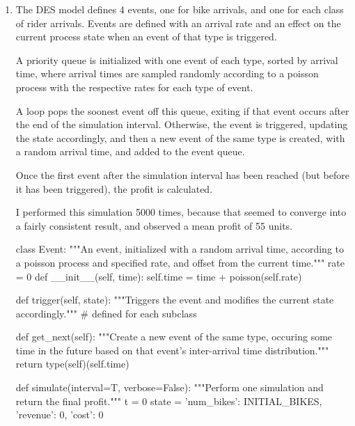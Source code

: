 \begin{solution}

    \begin{enumerate}
        \item The DES model defines 4 events, one for bike arrivals, and
            one for each class of rider arrivals. Events are defined
            with an arrival rate and an effect on the current process
            state when an event of that type is triggered.

            A priority queue is initialized with one event of each type,
            sorted by arrival time, where arrival times are sampled
            randomly according to a poisson process with the respective
            rates for each type of event.

            A loop pops the soonest event off this queue, exiting if
            that event occurs after the end of the simulation interval.
            Otherwise, the event is triggered, updating the state
            accordingly, and then a new event of the same type is
            created, with a random arrival time, and added to the event
            queue.

            Once the first event after the simulation interval has been
            reached (but before it has been triggered), the profit is
            calculated.

            I performed this simulation 5000 times, because that seemed
            to converge into a fairly consistent result, and observed a
            mean profit of 55 units.

            \begin{python}
class Event:
    """An event, initialized with a random arrival time,
    according to a poisson process and specified rate,
    and offset from the current time."""
    rate = 0
    def __init__(self, time):
        self.time = time + poisson(self.rate)

    def trigger(self, state):
        """Triggers the event and modifies the current state
        accordingly."""
        # defined for each subclass

    def get_next(self):
        """Create a new event of the same type,
        occuring some time in the future based on
        that event's inter-arrival time distribution."""
        return type(self)(self.time)
            \end{python}

            \begin{python}
def simulate(interval=T, verbose=False):
    """Perform one simulation and return the final profit."""
    t = 0
    state = {'num_bikes': INITIAL_BIKES, 'revenue': 0, 'cost': 0}


\end{python}
\end{enumerate}
\end{solution}
